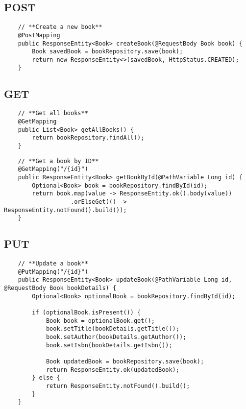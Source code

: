 \documentclass[a4paper, 12pt]{article}
\begin{document}
    \subsection{POST}
    \begin{lstlisting}
    // **Create a new book**
    @PostMapping
    public ResponseEntity<Book> createBook(@RequestBody Book book) {
        Book savedBook = bookRepository.save(book);
        return new ResponseEntity<>(savedBook, HttpStatus.CREATED);
    }
    \end{lstlisting}

    \subsection{GET}
    \begin{lstlisting}
    // **Get all books**
    @GetMapping
    public List<Book> getAllBooks() {
        return bookRepository.findAll();
    }
    \end{lstlisting}

    \begin{lstlisting}
    // **Get a book by ID**
    @GetMapping("/{id}")
    public ResponseEntity<Book> getBookById(@PathVariable Long id) {
        Optional<Book> book = bookRepository.findById(id);
        return book.map(value -> ResponseEntity.ok().body(value))
                   .orElseGet(() -> ResponseEntity.notFound().build());
    }
    \end{lstlisting}

    \subsection{PUT}
    \begin{lstlisting}
    // **Update a book**
    @PutMapping("/{id}")
    public ResponseEntity<Book> updateBook(@PathVariable Long id, @RequestBody Book bookDetails) {
        Optional<Book> optionalBook = bookRepository.findById(id);

        if (optionalBook.isPresent()) {
            Book book = optionalBook.get();
            book.setTitle(bookDetails.getTitle());
            book.setAuthor(bookDetails.getAuthor());
            book.setIsbn(bookDetails.getIsbn());

            Book updatedBook = bookRepository.save(book);
            return ResponseEntity.ok(updatedBook);
        } else {
            return ResponseEntity.notFound().build();
        }
    }
    \end{lstlisting}
\end{document}
